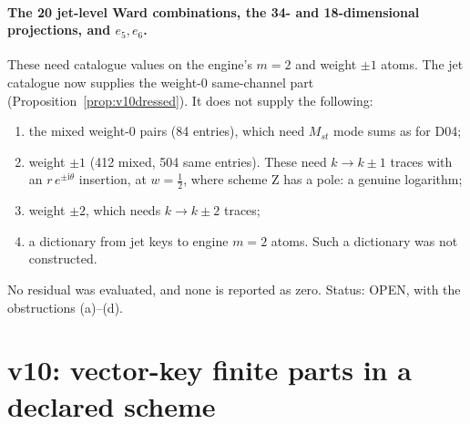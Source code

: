 \documentclass[11pt,a4paper]{article}
\newcommand{\ii}{\mathrm i}
\newcommand{\OPEN}{\textsf{OPEN}}
\theoremstyle{plain}
\theoremstyle{definition}
\theoremstyle{remark}
\numberwithin{equation}{section}
\begin{document}
\paragraph{The 20 jet-level Ward combinations, the 34- and 18-dimensional
projections, and \(e_5,e_6\).}
These need catalogue values on the engine's \(m=2\) and weight
\(\pm1\) atoms. The jet catalogue now supplies the weight-0
same-channel part (Proposition~\ref{prop:v10dressed}). It does not
supply the following:
\begin{enumerate}[label=(\alph*)]
\item the mixed weight-0 pairs (84 entries), which need \(M_{st}\)
mode sums as for D04;
\item weight \(\pm1\) (412 mixed, 504 same entries). These need
\(k\to k\pm1\) traces with an \(r\,e^{\pm\ii\theta}\) insertion, at
\(w=\tfrac12\), where scheme Z has a pole: a genuine
logarithm;
\item weight \(\pm2\), which needs \(k\to k\pm2\) traces;
\item a dictionary from jet keys to engine \(m=2\) atoms. Such a
dictionary was not constructed.
\end{enumerate}
No residual was evaluated, and none is reported as zero. Status:
\OPEN, with the obstructions (a)--(d).

\section{v10: vector-key finite parts in a declared scheme}
\label{sec:v10vector}
\end{document}
